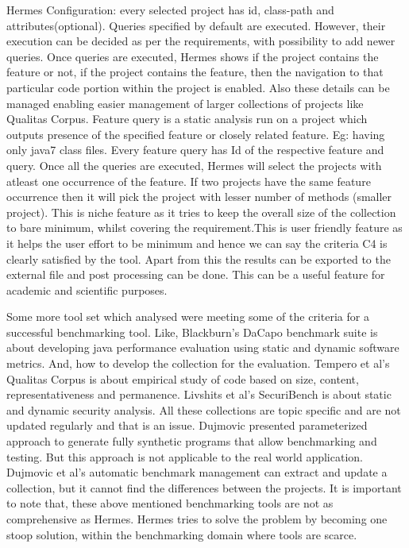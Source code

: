\documentclass[authoryear,preprint]{sigplanconf}
\begin{document}
Hermes Configuration: every selected project has id, class-path and attributes(optional). Queries specified by default are executed. However, their execution can be decided as per the requirements, with possibility to add newer queries. Once queries are executed, Hermes shows if the project contains the feature or not, if the project contains the feature, then the navigation to that particular code portion within the project is enabled. Also these details can be managed enabling easier management of larger collections of projects like Qualitas Corpus. Feature query is a static analysis run on a project which outputs presence of the specified feature or closely related feature. Eg: having only java7 class files. Every feature query has Id of the respective feature and query. Once all the queries are executed, Hermes will select the projects with atleast one occurrence of the feature. If two projects have the same feature occurrence then it will pick the project with lesser number of methods (smaller project). This is niche feature as it tries to keep the overall size of the collection to bare minimum, whilst covering the requirement.This is user friendly feature as it helps the user effort to be minimum and hence we can say the criteria C4 is clearly satisfied by the tool. Apart from this the results can be exported to the external file and post processing can be done. This can be a useful feature for academic and scientific purposes.

Some more tool set which analysed were meeting some of the criteria for a successful benchmarking tool. Like, Blackburn’s DaCapo benchmark suite\cite{Blackburn:2006:DBJ:1167473.1167488} is about developing java performance evaluation using static and dynamic software metrics. And, how to develop the collection for the evaluation. Tempero et al’s Qualitas Corpus is about empirical study of code based on size, content, representativeness and permanence. Livshits et al’s SecuriBench\cite{Livshits_defininga} is about static and dynamic security analysis. All these collections are topic specific and are not updated regularly and that is an issue. Dujmovic presented parameterized approach to generate fully synthetic programs that allow benchmarking and testing. But this approach is not applicable to the real world application. Dujmovic et al’s automatic benchmark management\cite{Dujmovic:2010:AGB:1712605.1712654} can extract and update a collection, but it cannot find the differences between the projects. It is important to note that, these above mentioned benchmarking tools are not as comprehensive as Hermes. Hermes tries to solve the problem by becoming one stoop solution, within the benchmarking domain where tools are scarce.
\end{document}
